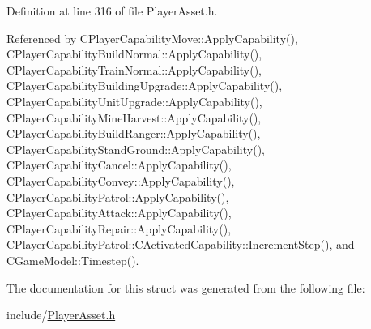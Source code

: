 Definition at line 316 of file Player\+Asset.\+h.



Referenced by C\+Player\+Capability\+Move\+::\+Apply\+Capability(), C\+Player\+Capability\+Build\+Normal\+::\+Apply\+Capability(), C\+Player\+Capability\+Train\+Normal\+::\+Apply\+Capability(), C\+Player\+Capability\+Building\+Upgrade\+::\+Apply\+Capability(), C\+Player\+Capability\+Unit\+Upgrade\+::\+Apply\+Capability(), C\+Player\+Capability\+Mine\+Harvest\+::\+Apply\+Capability(), C\+Player\+Capability\+Build\+Ranger\+::\+Apply\+Capability(), C\+Player\+Capability\+Stand\+Ground\+::\+Apply\+Capability(), C\+Player\+Capability\+Cancel\+::\+Apply\+Capability(), C\+Player\+Capability\+Convey\+::\+Apply\+Capability(), C\+Player\+Capability\+Patrol\+::\+Apply\+Capability(), C\+Player\+Capability\+Attack\+::\+Apply\+Capability(), C\+Player\+Capability\+Repair\+::\+Apply\+Capability(), C\+Player\+Capability\+Patrol\+::\+C\+Activated\+Capability\+::\+Increment\+Step(), and C\+Game\+Model\+::\+Timestep().



The documentation for this struct was generated from the following file\+:\begin{DoxyCompactItemize}
\item 
include/\hyperlink{PlayerAsset_8h}{Player\+Asset.\+h}\end{DoxyCompactItemize}
